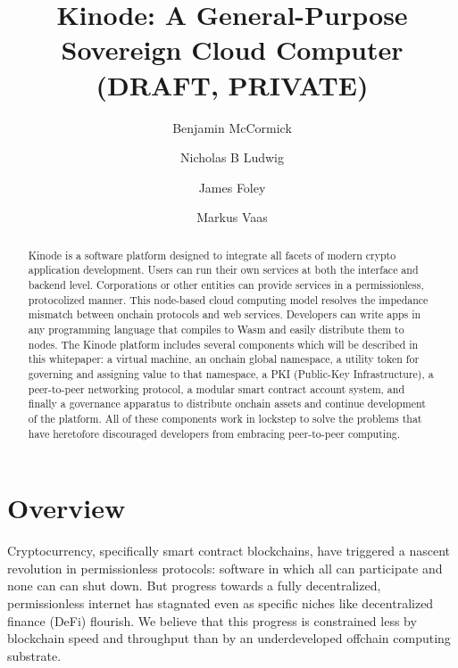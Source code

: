 \documentclass[runningheads]{llncs}
\begin{document}
%
\title{Kinode: A General-Purpose Sovereign Cloud Computer (DRAFT, PRIVATE)}
%
%
\author{
Benjamin McCormick \and
Nicholas B Ludwig \and
James Foley \and
Markus Vaas
}
%
\maketitle %
%
\begin{abstract}
Kinode is a software platform designed to integrate all facets of modern crypto application development.
Users can run their own services at both the interface and backend level.
Corporations or other entities can provide services in a permissionless, protocolized manner.
This node-based cloud computing model resolves the impedance mismatch between onchain protocols and web services.
Developers can write apps in any programming language that compiles to Wasm and easily distribute them to nodes.
The Kinode platform includes several components which will be described in this whitepaper: a virtual machine, an onchain global namespace, a utility token for governing and assigning value to that namespace, a PKI (Public-Key Infrastructure), a peer-to-peer networking protocol, a modular smart contract account system, and finally a governance apparatus to distribute onchain assets and continue development of the platform.
All of these components work in lockstep to solve the problems that have heretofore discouraged developers from embracing peer-to-peer computing.

\end{abstract}
%
\tableofcontents
%
%
%
%
\section{Overview}
\label{sec:overview}

Cryptocurrency, specifically smart contract blockchains, have triggered a nascent revolution in permissionless protocols: software in which all can participate and none can can shut down.
But progress towards a fully decentralized, permissionless internet has stagnated even as specific niches like decentralized finance (DeFi) flourish.
We believe that this progress is constrained less by blockchain speed and throughput than by an underdeveloped offchain computing substrate.
\end{document}
